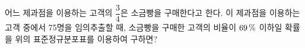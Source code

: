 \noindent\begin{minipage}[t]{0.58\linewidth}\vspace{0pt}\raggedright 어느 제과점을 이용하는 고객의 $\dfrac{3}{4}$은 소금빵을 구매한다고 한다. 이 제과점을 이용하는 고객 중에서 75명을 임의추출할 때, 소금빵을 구매한 고객의 비율이 $69\mkern3mu \%$ 이하일 확률을 위의 표준정규분포표를 이용하여 구하면?\end{minipage}\hfill\begin{minipage}[t]{0.4\linewidth}\vspace{0pt}\centering \resizebox{\ifdim\width>\linewidth\linewidth\else\width\fi}{!}{}\end{minipage}\par
{}
